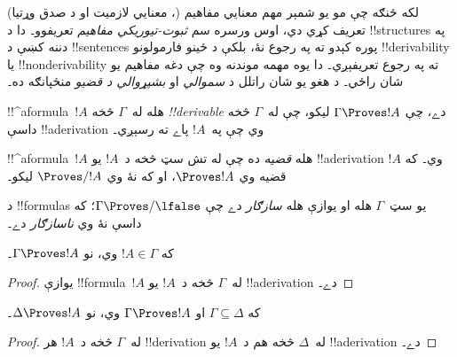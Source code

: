 \documentclass[../../../include/open-logic-section]{subfiles}
\begin{document}
      {}
      {}


\begin{explain}
لکه څنګه چې مو يو شمېر مهم معنايي مفاهيم
(، معنايي لازميت او د صدق وړتيا)
تعريف کړي دي، اوس ورسره سم \emph{ثبوت-تيوريکي مفاهيم} تعريفوو۔
دا د !!{structure}s په دننه کښې د !!{sentence}s پوره کېدو ته په
رجوع نۀ، بلکې د ځينو فارمولونو !!{derivability} يا
!!{nonderivability} ته په رجوع تعريفېږي۔ دا يوه مهمه موندنه وه چې
دغه مفاهيم يو شان راځي۔ د هغو يو شان راتلل د \emph{سموالي} او
\emph{بشپړوالي د قضيو} منځپانګه ده۔
\end{explain}

\begin{defn}[!!^{derivability}]
!!^a{formula}~$!A$ هله له~$\Gamma$ څخه \emph{!!{derivable}} دے،
چې $\Gamma \Proves !A$ ليکو، چې له~$\Gamma$ څخه داسې
!!a{derivation} وي چې په~$!A$ پاے ته رسېږي۔
\end{defn}

\begin{defn}[قضيې]
!!^a{formula}~$!A$ هله \emph{قضيه} ده چې له تش سټ څخه د~$!A$ يو
!!a{derivation} وي۔ که $!A$ قضيه وي $\Proves !A$، او که نۀ وي
$\Proves/ !A$ ليکو۔
\end{defn}

\begin{defn}[سازګاري]
د !!{formula}s يو سټ~$\Gamma$ هله او يوازې هله \emph{سازګار} دے
چې $\Gamma\Proves/ \lfalse$؛ که داسې نۀ وي \emph{ناسازګار} دے۔
\end{defn}

\begin{prop}[انعکاس]
که $!A \in \Gamma$ وي، نو $\Gamma \Proves !A$۔
\end{prop}

\begin{proof}
  يوازې !!{formula}~$!A$ له~$\Gamma$ څخه د~$!A$ يو
  !!a{derivation} دے۔
\end{proof}

\begin{prop}[زياتېدنه]
که $\Gamma \subseteq \Delta$ او $\Gamma \Proves !A$ وي، نو
$\Delta \Proves !A$۔
\end{prop}

\begin{proof}
له~$\Gamma$ څخه د~$!A$ هر !!{derivation} له~$\Delta$ څخه هم د~$!A$
يو !!a{derivation} دے۔
\end{proof}
\end{document}
